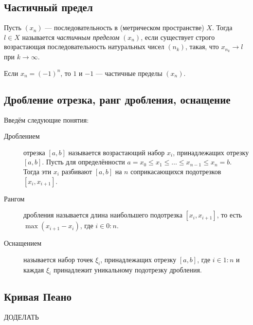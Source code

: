 \subsection{Частичный предел}

\begin{definition}
	Пусть \((x_n)\) --- последовательность в (метрическом пространстве) \(X\). Тогда \(l \in X\) называется \textit{частичным пределом} \((x_n)\), если существует строго возрастающая последовательность натуральных чисел \((n_k)\), такая, что \(x_{n_k} \to l\) при \(k \to \infty\).
\end{definition}

\begin{example}
	Если \(x_n = (-1)^n\), то \(1\) и \(-1\) --- частичные пределы \((x_n)\).
\end{example}

\subsection{Дробление отрезка, ранг дробления, оснащение}

\begin{definition}
	Введём следующие понятия:
	\begin{description}
		\item[Дроблением] отрезка \([a, b]\) называется возрастающий набор \(x_i\), принадлежащих отрезку \([a, b]\). Пусть для определённости \linebreak \(a = x_0 \leqslant x_1 \leqslant \ldots \leqslant x_{n - 1} \leqslant x_n = b\). Тогда эти \(x_i\) разбивают \([a, b]\) на \(n\) соприкасающихся подотрезков \([x_i, x_{i + 1}]\).
		\item[Рангом] дробления называется длина наибольшего подотрезка \([x_i, x_{i + 1}]\), то есть \(\max (x_{i + 1} - x_i)\), где \(i \in 0 : n\).
		\item[Оснащением] называется набор точек \(\xi_i\), принадлежащих отрезку \([a, b]\), где \(i \in 1 : n\) и каждая \(\xi_i\) принадлежит уникальному подотрезку дробления.
	\end{description}
\end{definition}

\subsection{Кривая Пеано}

\begin{example}
	ДОДЕЛАТЬ
\end{example}

